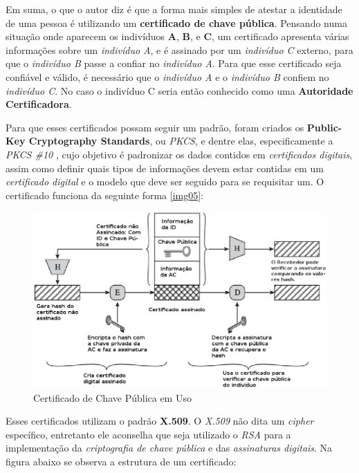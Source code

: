 	Em suma, o que o autor diz é que a forma mais simples de atestar a identidade de uma pessoa é utilizando um \textbf{certificado de chave pública}. Pensando numa situação onde aparecem os indivíduos \textbf{A}, \textbf{B}, e \textbf{C}, um certificado apresenta várias informações sobre um \textit{indivíduo A}, e é assinado por um \textit{indivíduo C} externo, para que o \textit{indivíduo B} passe a confiar no \textit{indivíduo A}. Para que esse certificado seja confiável e válido, é necessário que o \textit{indivíduo A} e o \textit{indivíduo B} confiem no \textit{indivíduo C}. No caso o indivíduo C seria então conhecido como uma \textbf{Autoridade Certificadora}.

	Para que esses certificados possam seguir um padrão, foram criados os \textbf{Public-Key Cryptography Standards}, ou \textit{PKCS}, e dentre elas, especificamente a \textit{PKCS \#10} \cite{pkcs10}, cujo objetivo é padronizar os dados contidos em \textit{certificados digitais}, assim como definir quais tipos de informações devem estar contidas em um \textit{certificado digital} e o modelo que deve ser seguido para se requisitar um. O certificado funciona da seguinte forma \ref{img05}:

	\begin{figure}[h]
		\centering
		\label{img06}
		\caption{Certificado de Chave Pública em Uso \cite[p.~430]{stallings11}}
		\includegraphics[keepaspectratio=true,scale=0.46]{figuras/img05.eps}
	\end{figure}
 
	Esses certificados utilizam o padrão \textbf{X.509}. O \textit{X.509} não dita um \textit{cipher} específico, entretanto ele aconselha que seja utilizado o \textit{RSA} para a implementação da \textit{criptografia de chave pública} e das \textit{assinaturas digitais}. Na figura abaixo se observa a estrutura de um certificado:

